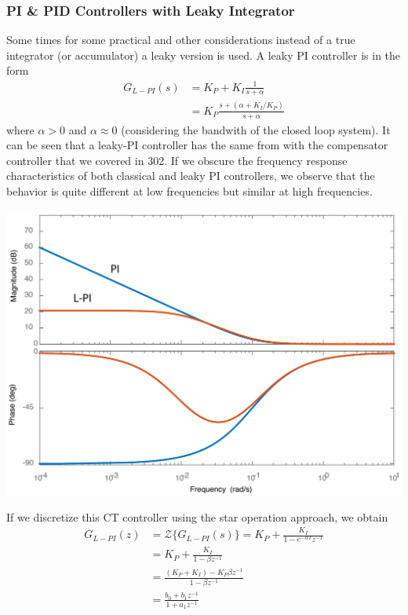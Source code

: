 \documentclass[twoside]{article}
\begin{document}
\subsubsection*{PI \& PID Controllers with Leaky Integrator}
%
Some times for some practical and other considerations
instead of a true integrator (or accumulator) a leaky version 
is used. A leaky PI controller is in the form
%
\begin{align*}
  G_{L-PI}(s) &= K_P + K_I \frac{1}{s + \alpha} \\
  &= K_P \frac{s + ( \alpha + K_I / K_P) }{s + \alpha}
\end{align*}
%
where $\alpha > 0$ and $\alpha \approx 0$ (considering the bandwith 
of the closed loop system). It can be seen that a leaky-PI controller
has the same from with the compensator controller that we covered in 
302. If we obscure the frequency response characteristics of both
classical and leaky PI controllers, we observe that the behavior is
quite different at low frequencies but similar at high frequencies.
%
    \begin{center}
\begin{minipage}[h]{0.6\linewidth}
    \begin{center}
      \includegraphics[width=\textwidth]{PI}
    \end{center}
\end{minipage}
    \end{center}
%
If we discretize this CT controller
using the star operation approach, we obtain
%
\begin{align*}
  G_{L-PI}(z) &= \mathcal{Z} \lbrace G_{L-PI}(s) \rbrace  = K_P + 
  \frac{K_I}{1 - e^{-\alpha T} z^{-1}} \\
  &= K_P  + \frac{K_I}{1 - \beta z^{-1}} 
  \\
  &= \frac{(K_P  + K_I) - K_P \beta z^{-1} }{1 - \beta z^{-1}} 
  \\
 &= \frac{ b_0 + b_1 z^{-1}}{1 + a_1 z^{-1}} 
\end{align*}
\end{document}
